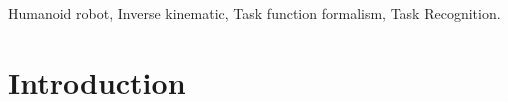 \documentclass[journal]{IEEEtran}
\begin{document}
\begin{IEEEkeywords}
Humanoid robot, Inverse kinematic, Task function formalism, Task Recognition.
\end{IEEEkeywords}

\IEEEpeerreviewmaketitle



\section{Introduction}
% 
% 
% 
% 
\end{document}
